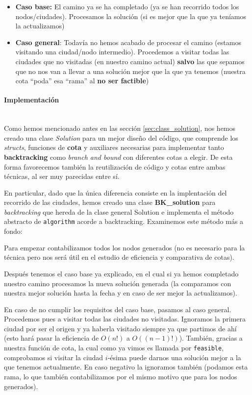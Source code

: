 \documentclass{article}
\newcommand{\myparagraph}[1]{\paragraph{#1}\mbox{}\\}
\begin{document}
\begin{itemize}
    \item \textbf{Caso base:}
    El camino ya se ha completado (ya se han recorrido todos los nodos/ciudades). Procesamos la solución (si es mejor que la que ya teníamos la actualizamos)
    \item \textbf{Caso general}:
    Todavía no hemos acabado de procesar el camino (estamos visitando una ciudad/nodo intermedio). Procedemos a visitar todas las ciudades que no visitadas (en nuestro camino actual) \textbf{salvo} las que sepamos que no nos van a llevar a una solución mejor que la que ya tenemos (nuestra cota ``poda'' esa ``rama'' al \textbf{no ser factible})
\end{itemize}

\myparagraph{Implementación}

Como hemos mencionado antes en las sección \ref{sec:class_solution}, nos hemos creado una clase \textit{Solution} para un mejor diseño del código,
que comprende los \textit{structs}, funciones de \textbf{cota} y auxiliares
necesarias para implementar tanto \textbf{backtracking} como \textit{branch and bound} con diferentes cotas a elegir. De esta forma favorecemos también la reutilización de código y cotas entre ambas técnicas, al ser muy parecidas entre sí.



En particular, dado que la única diferencia consiste en la implentación del recorrido de las ciudades, hemos creado una clase \textbf{BK\_solution} para \textit{backtracking} que hereda de la clase general Solution e implementa
el método abstracto de \verb|algorithm| acorde a backtracking. Examinemos 
este método más a fondo:



Para empezar contabilizamos todos los nodos generados (no es necesario para la técnica pero nos será útil en el estudio de eficiencia y comparativa de cotas).

Después tenemos el caso base ya explicado, en el cual si ya hemos completado nuestro camino procesamos la nueva solución generada (la comparamos con nuestra mejor solución hasta la fecha y en caso de ser mejor la actualizamos).



En caso de no cumplir los requisitos del caso base, pasamos al caso general.
Procedemos pues a visitar todas las ciudades no visitadas.
Ignoramos la primera ciudad por ser el origen y ya haberla visitado siempre ya que partimos de ahí (esto hará pasar la eficiencia de $O(n!)$ a $O((n-1)!)$).
También, gracias a nuestra función de cota, la cual como ya vimos es llamada por \verb|feasible|, comprobamos si visitar la ciudad $i$-ésima puede darnos una solución mejor a la que tenemos actualmente. En caso negativo la ignoramos también (podamos esta rama, lo que también contabilizamos por el mismo motivo que para los nodos generados).
\end{document}
